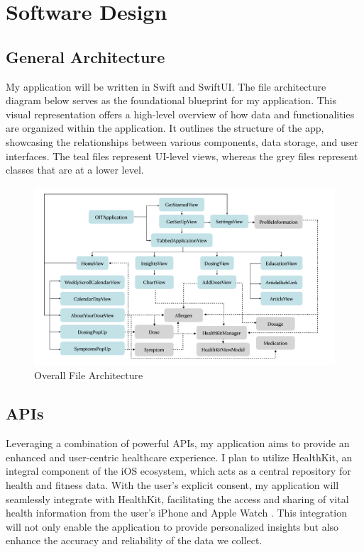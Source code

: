 \chapter{Software Design}

\section{General Architecture}

My application will be written in Swift and SwiftUI. The file architecture diagram below serves as the foundational blueprint for my application. This visual representation offers a high-level overview of how data and functionalities are organized within the application. It outlines the structure of the app, showcasing the relationships between various components, data storage, and user interfaces. The teal files represent UI-level views, whereas the grey files represent classes that are at a lower level.

\begin{figure}[H]
    \centering
    \includegraphics[width=1\linewidth]{thesis/chapters/images/overallFileArchitecture.png}
    \caption{Overall File Architecture}
    \label{fig:overall-file-architecture}
\end{figure}

\section{APIs}

Leveraging a combination of powerful APIs, my application aims to provide an enhanced and user-centric healthcare experience. I plan to utilize HealthKit, an integral component of the iOS ecosystem, which acts as a central repository for health and fitness data. With the user's explicit consent, my application will seamlessly integrate with HealthKit, facilitating the access and sharing of vital health information from the user's iPhone and Apple Watch \cite{HealthKit}. This integration will not only enable the application to provide personalized insights but also enhance the accuracy and reliability of the data we collect.

